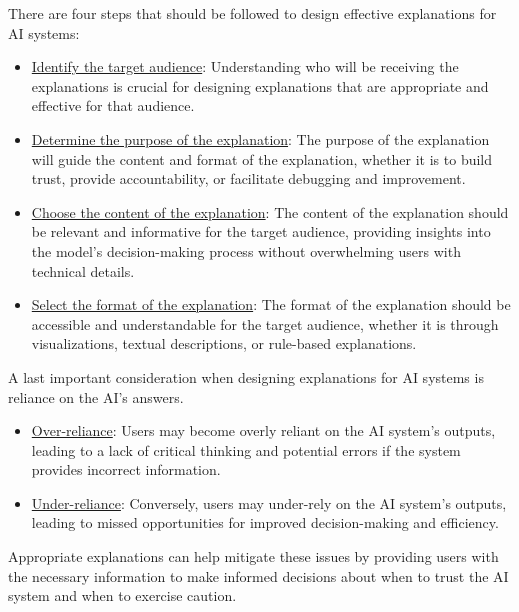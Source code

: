 There are four steps that should be followed to design effective explanations for AI systems:
\begin{itemize}
    \item \ul{Identify the target audience}: Understanding who will be receiving the explanations is crucial for designing explanations that are appropriate and effective for that audience.
    \item \ul{Determine the purpose of the explanation}: The purpose of the explanation will guide the content and format of the explanation, whether it is to build trust, provide accountability, or facilitate debugging and improvement.
    \item \ul{Choose the content of the explanation}: The content of the explanation should be relevant and informative for the target audience, providing insights into the model's decision-making process without overwhelming users with technical details.
    \item \ul{Select the format of the explanation}: The format of the explanation should be accessible and understandable for the target audience, whether it is through visualizations, textual descriptions, or rule-based explanations.
\end{itemize}

A last important consideration when designing explanations for AI systems is reliance on the AI's answers.
\begin{itemize}
    \item \ul{Over-reliance}: Users may become overly reliant on the AI system's outputs, leading to a lack of critical thinking and potential errors if the system provides incorrect information.
    \item \ul{Under-reliance}: Conversely, users may under-rely on the AI system's outputs, leading to missed opportunities for improved decision-making and efficiency.
\end{itemize}

Appropriate explanations can help mitigate these issues by providing users with the necessary information to make informed decisions about when to trust the AI system and when to exercise caution.